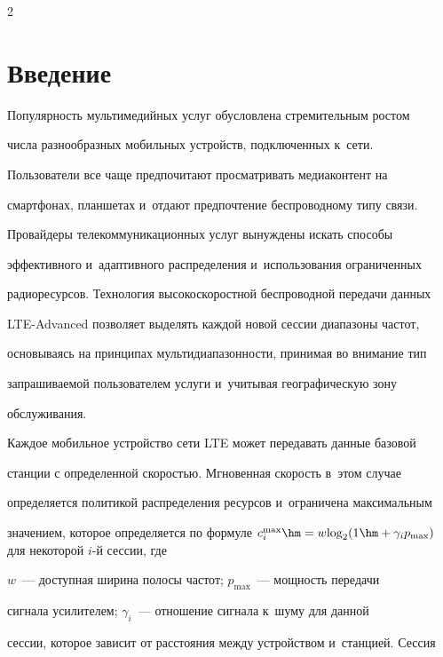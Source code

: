 \begin{multicols}{2}



\label{st\stat}



\section{Введение}

    

  Популярность мультимедийных услуг обуслов\-ле\-на стремительным ростом 

числа разнообразных мобильных устройств, подключенных к~сети. 

Пользователи все чаще предпочитают просматривать медиаконтент на 

смартфонах, планшетах и~отдают предпочтение беспроводному типу связи. 

Провайдеры телекоммуникационных услуг вынуждены искать способы 

эффективного и~адаптивного распределения и~использования ограниченных 

радиоресурсов. Технология высокоскоростной беспроводной передачи данных 

LTE-Advanced позволяет выделять каждой новой сессии диапазоны частот, 

основываясь на принципах мультидиапазонности, принимая во внимание тип 

запрашиваемой пользователем услуги и~учитывая географическую зону 

обслуживания. 

  

  Каждое мобильное устройство сети LTE может передавать данные базовой 

станции с определенной скоростью. Мгновенная скорость в~этом случае 

определяется политикой распределения ресурсов и~ограничена максимальным 

значением, которое определяется по формуле $c_i^{\max} \hm= 

w\mathrm{log}_2(1\hm+\gamma_ip_{\max})$ для некоторой $i$-й сес\-сии, где 

$w$~--- доступная ширина полосы частот; $p_{\max}$~--- мощность передачи 

сигнала усилителем; $\gamma_i$~--- отношение сигнала к~шуму для данной 

сессии, которое зависит от расстояния между устройством и~станцией. Сессия 


\end{multicols}
